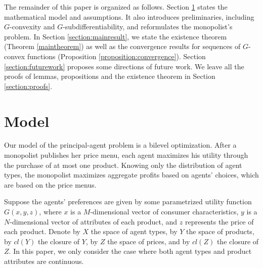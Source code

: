 \documentclass[a4paper, 11pt]{amsart}
\numberwithin{equation}{section}
\theoremstyle{plain}
\theoremstyle{definition}
\theoremstyle{remark}
\begin{document}
 



The remainder of this paper is organized as follows. Section \ref{section:model} states the mathematical model and assumptions. It also introduces preliminaries, including $G$-convexity and $G$-subdifferentiability, and reformulates the monopolist's problem. In Section \ref{section:mainresult}, we state the existence theorem (Theorem \ref{maintheorem}) as well as the convergence results for sequences of $G$-convex functions (Proposition \ref{proposition:convergence}). Section \ref{section:futurework} proposes some directions of future work. We leave all the proofs of lemmas, propositions and the existence theorem in Section \ref{section:proofs}. 
 

\bigskip
 

\section{Model}\label{section:model}



{Our model of the principal-agent problem is a bilevel optimization. After a monopolist publishes her price menu, each agent maximizes his utility through the purchase of at most one product. Knowing only the distribution of agent types, the monopolist maximizes aggregate profits based on agents' choices, which are based on the price menus.}\medskip


Suppose the agents' preferences are given by some parametrized utility function  $G(x, y, z)$, where $x$ is a $M$-dimensional vector of consumer characteristics, $y$ is a $N$-dimensional vector of attributes of each product, and $z$ represents the price of each product. Denote {by} $X$ the space of agent types, by $Y$ the space of products, by $cl(Y)$ the closure of $Y$, by $Z$ the space of prices, and by $cl(Z)$ the closure of $Z$. {In this paper, we only consider the case where both agent types and product attributes are continuous.} \medskip
\end{document}

